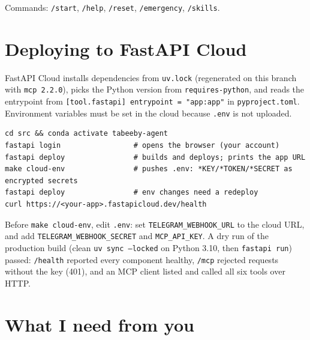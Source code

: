 \documentclass[11pt,a4paper]{article}
\newcommand{\code}[1]{\texttt{#1}}
\begin{document}
Commands: \code{/start}, \code{/help}, \code{/reset}, \code{/emergency}, \code{/skills}.

\section{Deploying to FastAPI Cloud}

FastAPI Cloud installs dependencies from \code{uv.lock} (regenerated on this branch with \code{mcp 2.2.0}), picks the Python version from \code{requires-python}, and reads the entrypoint from \code{[tool.fastapi] entrypoint = "app:app"} in \code{pyproject.toml}. Environment variables must be set in the cloud because \code{.env} is not uploaded.

\begin{lstlisting}
cd src && conda activate tabeeby-agent
fastapi login                 # opens the browser (your account)
fastapi deploy                # builds and deploys; prints the app URL
make cloud-env                # pushes .env: *KEY/*TOKEN/*SECRET as encrypted secrets
fastapi deploy                # env changes need a redeploy
curl https://<your-app>.fastapicloud.dev/health
\end{lstlisting}

Before \code{make cloud-env}, edit \code{.env}: set \code{TELEGRAM\_WEBHOOK\_URL} to the cloud URL, and add \code{TELEGRAM\_WEBHOOK\_SECRET} and \code{MCP\_API\_KEY}. A dry run of the production build (clean \code{uv sync --locked} on Python 3.10, then \code{fastapi run}) passed: \code{/health} reported every component healthy, \code{/mcp} rejected requests without the key (401), and an MCP client listed and called all six tools over HTTP.

\section{What I need from you}
\end{document}
